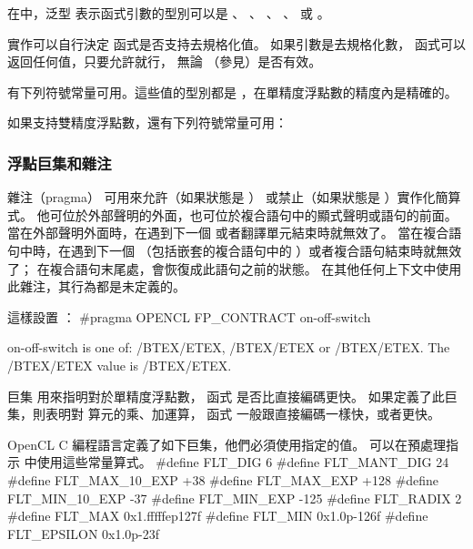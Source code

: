在中，泛型  表示函式引數的型別可以是
 、 、 、 、
  或 。

{}

實作可以自行決定  函式是否支持去規格化值。
如果引數是去規格化數，  函式可以返回任何值，只要允許就行，
無論  （參見）是否有效。

有下列符號常量可用。這些值的型別都是 ，在單精度浮點數的精度內是精確的。


如果支持雙精度浮點數，還有下列符號常量可用：


\subsubsection{浮點巨集和雜注}

雜注（pragma）  可用來允許（如果狀態是 ）
或禁止（如果狀態是 ）實作化簡算式。
他可位於外部聲明的外面，也可位於複合語句中的顯式聲明或語句的前面。
當在外部聲明外面時，在遇到下一個  或者翻譯單元結束時就無效了。
當在複合語句中時，在遇到下一個 
（包括嵌套的複合語句中的 ）或者複合語句結束時就無效了；
在複合語句末尾處，會恢復成此語句之前的狀態。
在其他任何上下文中使用此雜注，其行為都是未定義的。

這樣設置 ：
\startclc
#pragma OPENCL FP_CONTRACT on-off-switch

on-off-switch is one of:
	/BTEX/ETEX, /BTEX/ETEX or /BTEX/ETEX.
	The /BTEX/ETEX value is /BTEX/ETEX.
\stopclc

巨集  用來指明對於單精度浮點數，
函式  是否比直接編碼更快。
如果定義了此巨集，則表明對  算元的乘、加運算，
函式  一般跟直接編碼一樣快，或者更快。

OpenCL C 編程語言定義了如下巨集，他們必須使用指定的值。
可以在預處理指示  中使用這些常量算式。
\startclc
#define FLT_DIG		6
#define FLT_MANT_DIG	24
#define FLT_MAX_10_EXP	+38
#define FLT_MAX_EXP	+128
#define FLT_MIN_10_EXP	-37
#define FLT_MIN_EXP	-125
#define FLT_RADIX	2
#define FLT_MAX		0x1.fffffep127f
#define FLT_MIN		0x1.0p-126f
#define FLT_EPSILON	0x1.0p-23f
\stopclc


